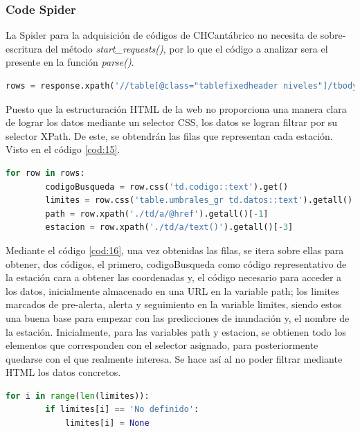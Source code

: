 \subsubsection{Code Spider}
La Spider para la adquisición de códigos de CHCantábrico no necesita de sobre-escritura del método \textit{start\_requests()}, por lo que el código a analizar sera el presente en la función \textit{parse()}.

\begin{lstlisting}[language=Python, caption={Selector en \textit{parse()} de CHCantábrico Code Spider}, label=cod:15]
	rows = response.xpath('//table[@class="tablefixedheader niveles"]/tbody/tr')
\end{lstlisting}

Puesto que la estructuración HTML de la web no proporciona una manera clara de lograr los datos mediante un selector CSS, los datos se logran filtrar por su selector XPath. De este, se obtendrán las filas que representan cada estación. Visto en el código \ref{cod:15}.

\begin{lstlisting}[language=Python, caption={Trabajar sobre los datos de CHCantábrico Code Spider}, label=cod:16]
	for row in rows:
		codigoBusqueda = row.css('td.codigo::text').get()
		limites = row.css('table.umbrales_gr td.datos::text').getall()
		path = row.xpath('./td/a/@href').getall()[-1]
		estacion = row.xpath('./td/a/text()').getall()[-3]
\end{lstlisting}

Mediante el código \ref{cod:16}, una vez obtenidas las filas, se itera sobre ellas para obtener, dos códigos, el primero, codigoBusqueda como código representativo de la estación cara a obtener las coordenadas y, el código necesario para acceder a los datos, inicialmente almacenado en una URL en la variable path; los limites marcados de pre-alerta, alerta y seguimiento en la variable limites, siendo estos una buena base para empezar con las predicciones de inundación y, el nombre de la estación.\newline
\newline
Inicialmente, para las variables path y estacion, se obtienen todo los elementos que corresponden con el selector asignado, para posteriormente quedarse con el que realmente interesa. Se hace así al no poder filtrar mediante HTML los datos concretos.

\begin{lstlisting}[language=Python, caption={Combrobar limites de CHCantábrico Code Spider}, label=cod:17]
	for i in range(len(limites)):
		if limites[i] == 'No definido':
			limites[i] = None
\end{lstlisting}

